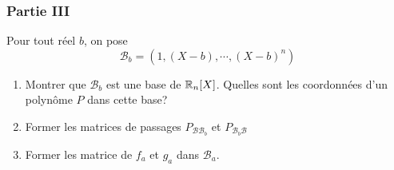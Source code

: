 \subsubsection*{Partie III}
Pour tout r{\'e}el $b$, on pose
\[\mathcal{B}_b=\left(1,(X-b),\cdots,(X-b)^n \right)\]
\begin{enumerate}
  \item Montrer que $\mathcal{B}_b$ est une base de $\mathbb{R}_{n}[X]$. Quelles sont les
  coordonn{\'e}es d'un polyn{\^o}me $P$ dans cette base?
  \item Former les matrices de passages
  $P_{\mathcal{B}\mathcal{B}_b}$ et $P_{\mathcal{B}_b\mathcal{B}}$
  \item Former les matrice de $f_a$ et $g_a$ dans $\mathcal{B}_a$.
\end{enumerate}

